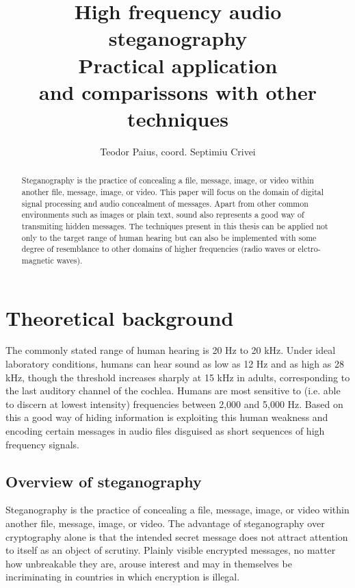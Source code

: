 \documentclass[12 pct]{report}
\begin{document}
\title{%
  High frequency audio steganography \\
  \large Practical application \\
    and comparissons with other techniques}

\author{Teodor Paius, coord. Septimiu Crivei}

\maketitle

\begin{abstract}
Steganography is the practice of concealing a file, message, image, or video within another file, message, image, or video. This paper will focus on the domain of digital signal processing and audio concealment of messages. Apart from other common environments such as images or plain text, sound also represents a good way of transmiting hidden messages. The techniques present in this thesis can be applied not only to the target range of human hearing but can also be implemented with some degree of resemblance to other domains of higher frequencies (radio waves or elctro-magnetic waves).
\end{abstract}

\tableofcontents




\chapter{Theoretical background}

The commonly stated range of human hearing is 20 Hz to 20 kHz. Under ideal laboratory conditions, humans can hear sound as low as 12 Hz and as high as 28 kHz, though the threshold increases sharply at 15 kHz in adults, corresponding to the last auditory channel of the cochlea. Humans are most sensitive to (i.e. able to discern at lowest intensity) frequencies between 2,000 and 5,000 Hz. Based on this a good way of hiding information is exploiting this human weakness and encoding certain messages in audio files disguised as short sequences of high frequency signals.




\section{Overview of steganography}
Steganography is the practice of concealing a file, message, image, or video within another file, message, image, or video.
The advantage of steganography over cryptography alone is that the intended secret message does not attract attention to itself as an object of scrutiny. Plainly visible encrypted messages, no matter how unbreakable they are, arouse interest and may in themselves be incriminating in countries in which encryption is illegal.\cite{note4}
\end{document}
